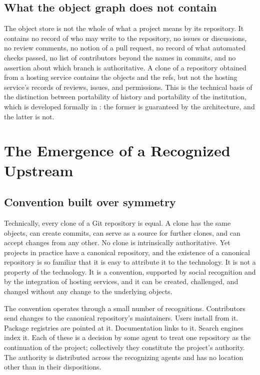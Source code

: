 \documentclass[11pt,twoside,openright]{book}
\theoremstyle{plain}
\theoremstyle{definition}
\theoremstyle{remark}
\begin{document}
\section{What the object graph does not contain}

The object store is not the whole of what a project means by its repository. It contains no record of who may write to the repository, no issues or discussions, no review comments, no notion of a pull request, no record of what automated checks passed, no list of contributors beyond the names in commits, and no assertion about which branch is authoritative. A clone of a repository obtained from a hosting service contains the objects and the refs, but not the hosting service's records of reviews, issues, and permissions. This is the technical basis of the distinction between portability of history and portability of the institution, which is developed formally in : the former is guaranteed by the architecture, and the latter is not.

\chapter{The Emergence of a Recognized Upstream}\label{ch:upstream}

\section{Convention built over symmetry}

Technically, every clone of a Git repository is equal. A clone has the same objects, can create commits, can serve as a source for further clones, and can accept changes from any other. No clone is intrinsically authoritative. Yet projects in practice have a canonical repository, and the existence of a canonical repository is so familiar that it is easy to attribute it to the technology. It is not a property of the technology. It is a convention, supported by social recognition and by the integration of hosting services, and it can be created, challenged, and changed without any change to the underlying objects.

The convention operates through a small number of recognitions. Contributors send changes to the canonical repository's maintainers. Users install from it. Package registries are pointed at it. Documentation links to it. Search engines index it. Each of these is a decision by some agent to treat one repository as the continuation of the project; collectively they constitute the project's authority. The authority is distributed across the recognizing agents and has no location other than in their dispositions.
\end{document}
